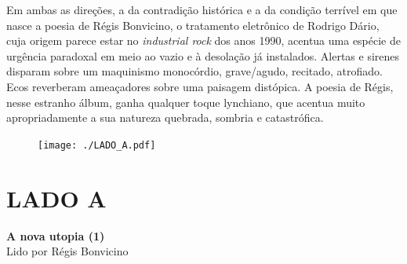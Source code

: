 Em ambas as direções, a da contradição histórica e a da condição
terrível em que nasce a poesia de Régis Bonvicino, o tratamento
eletrônico de Rodrigo Dário, cuja origem parece estar no
\emph{industrial rock} dos anos 1990, acentua uma espécie de urgência
paradoxal em meio ao vazio e à desolação já instalados. Alertas e
sirenes disparam sobre um maquinismo monocórdio, grave/agudo, recitado,
atrofiado. Ecos reverberam ameaçadores sobre uma paisagem distópica. A
poesia de Régis, nesse estranho álbum, ganha qualquer toque lynchiano,
que acentua muito apropriadamente a sua natureza quebrada, sombria e
catastrófica.

\pagebreak
\thispagestyle{empty}

\begin{absolutelynopagebreak}

\begin{vplace}
\begin{figure}[H]
\begin{adjustwidth}{-3cm}{}
  \vspace*{14.9cm}
  \texttt{[image: ./LADO\_A.pdf]}  
\end{adjustwidth}

\end{figure}
\end{vplace}

\end{absolutelynopagebreak}

\chapter*{LADO A}
\textbf{A nova utopia (1)}\\
Lido por Régis Bonvicino

\bigskip

